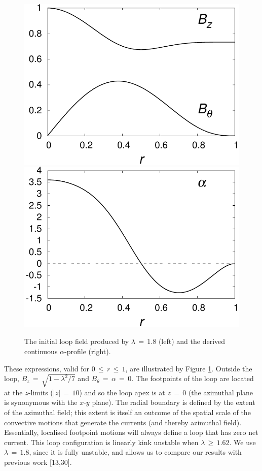 \documentclass{./packages/rs/rsproca}
\begin{document}
\begin{figure}[!h]
  \centering
  \includegraphics[scale=0.47]{./gnuplot/b}
  \hspace{10pt}
  \includegraphics[scale=0.47]{./gnuplot/alpha}
  \caption{\small{The initial loop field produced by $\lambda\,{=}\,1.8$ (left) and the derived continuous $\alpha$-profile (right).}}
  \label{fig_field_alpha}
\end{figure}

These expressions, valid for $0\,{\le}\,r\,{\le}\,1$, are illustrated by Figure \ref{fig_field_alpha}. Outside the loop, $B_z\,{=}\,\sqrt{1 - \lambda^2/7}$ and $B_{\theta}\,{=}\,\alpha\,{=}\,0$. The footpoints of the loop are located at the $z$-limits ($|z|\,{=}\,10$) and so the loop apex is at $z\,{=}\,0$ (the azimuthal plane is synonymous with the $x$-$y$ plane). The radial boundary is defined by the extent of the azimuthal field; this extent is itself an outcome of the spatial scale of the convective motions that generate the currents (and thereby azimuthal field). Essentially, localised footpoint motions will always define a loop that has zero net current. This loop configuration is linearly kink unstable when $\lambda\,{\ge}\,1.62$. We use $\lambda\,{=}\,1.8$, since it is fully unstable, and allows us to compare our results with previous work [13,30].
\end{document}
